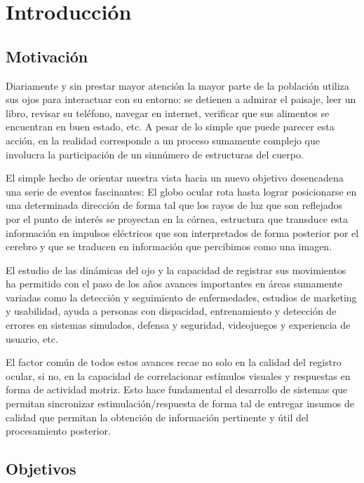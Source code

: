 \documentclass[../main.tex]{subfiles}
\begin{document}
		
\chapter{Introducción}
\label{cha:01_introducción}
	\section{Motivación}
	\label{sec:01_motivacion}

		Diariamente y sin prestar mayor atención la mayor parte de la población utiliza sus ojos para interactuar con su entorno: se detienen a admirar el paisaje, leer un libro, revisar su teléfono, navegar en internet, verificar que sus alimentos se encuentran en buen estado, etc. A pesar de lo simple que puede parecer esta acción, en la realidad corresponde a un proceso sumamente complejo que involucra la participación de un sinnúmero de estructuras del cuerpo. 

		El simple hecho de orientar nuestra vista hacia un nuevo objetivo desencadena una serie de eventos fascinantes: El globo ocular rota hasta lograr posicionarse en una determinada dirección de forma tal que los rayos de luz que son reflejados por el punto de interés se proyectan en la córnea, estructura que transduce esta información en impulsos eléctricos que son interpretados de forma posterior por el cerebro y que se traducen en información que percibimos como una imagen. 

		El estudio de las dinámicas del ojo y la capacidad de registrar sus movimientos ha permitido con el paso de los años avances importantes en áreas sumamente variadas como la detección y seguimiento de enfermedades, estudios de marketing y usabilidad, ayuda a personas con dispacidad, entrenamiento y detección de errores en sistemas simulados, defensa y seguridad, videojuegos y experiencia de usuario, etc.

		El factor común de todos estos avances recae no solo en la calidad del registro ocular, si no, en la capacidad de correlacionar estímulos visuales y respuestas en forma de actividad motriz. Esto hace fundamental el desarrollo de sistemas que permitan sincronizar estimulación/respuesta de forma tal de entregar insumos de calidad que permitan la obtención de información pertinente y útil del procesamiento posterior.  

	\section{Objetivos}
	\label{sec:01_objetivos}
\end{document}
